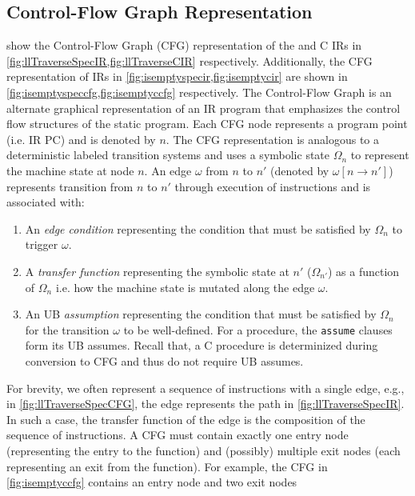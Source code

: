 \subsection{Control-Flow Graph Representation}
\label{sec:cfg}
 show the Control-Flow Graph (CFG) representation
of the \SpecL{} and C IRs in \cref{fig:llTraverseSpecIR,fig:llTraverseCIR} respectively.
Additionally, the CFG representation of IRs in \cref{fig:isemptyspecir,fig:isemptycir} are
shown in \cref{fig:isemptyspeccfg,fig:isemptyccfg} respectively.
The Control-Flow Graph is an alternate graphical representation of an IR program that emphasizes
the control flow structures of the static program.
Each CFG node represents a program point (i.e. IR PC) and is denoted by $n$.
The CFG representation is analogous to a deterministic labeled transition systems and
uses a symbolic state $\Omega_n$ to represent the machine state at node $n$.
An edge $\omega$ from $n$ to $n'$ (denoted by $\omega[n \rightarrow n']$) represents transition
from $n$ to $n'$ through execution of instructions and is associated with:
\vspace{-10px}
\begin{enumerate}
\item An {\em edge condition} representing the condition that must be satisfied by $\Omega_n$
to trigger $\omega$.
\item A {\em transfer function} representing the symbolic state at $n'$ ($\Omega_{n'}$) as a function of $\Omega_n$
i.e. how the machine state is mutated along the edge $\omega$.
\item An UB {\em assumption} representing the condition that must be satisfied by $\Omega_n$ for
the transition $\omega$ to be well-defined.
For a \SpecL{} procedure, the {\tt assume} clauses form its UB assumes.
Recall that, a C procedure is determinized during conversion to CFG and thus do not require UB assumes.
\end{enumerate}
\vspace{-10px}
For brevity, we often represent a sequence of instructions with a single edge, e.g.,
in \cref{fig:llTraverseSpecCFG}, the edge  represents the path  in \cref{fig:llTraverseSpecIR}.
In such a case, the transfer function of the edge is the composition of the sequence of instructions.
A CFG must contain exactly one entry node (representing the entry to the function) and (possibly)
multiple exit nodes (each representing an exit from the function).
For example, the CFG in \cref{fig:isemptyccfg} contains an entry node  and two exit nodes
